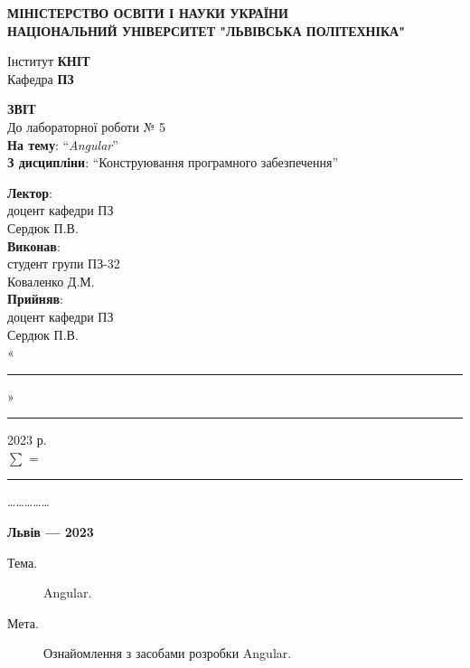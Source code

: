 \documentclass[14pt]{extreport}
\newcommand\subject{Конструювання програмного забезпечення}
\newcommand\lecturer{доцент кафедри ПЗ\\Сердюк П.В.}
\newcommand\teacher{доцент кафедри ПЗ\\Сердюк П.В.}
\newcommand\mygroup{ПЗ-32}
\newcommand\lab{5}
\newcommand\theme{Angular}
\newcommand\purpose{Ознайомлення з засобами розробки Angular}
\begin{document}
\begin{normalsize}
	\begin{titlepage}
		\thispagestyle{empty}
		\begin{center}
			\textbf{МІНІСТЕРСТВО ОСВІТИ І НАУКИ УКРАЇНИ\\
				НАЦІОНАЛЬНИЙ УНІВЕРСИТЕТ "ЛЬВІВСЬКА ПОЛІТЕХНІКА"}
		\end{center}
		\begin{flushright}
			Інститут \textbf{КНІТ}\\
			Кафедра \textbf{ПЗ}
		\end{flushright}
		\vspace{200pt}
		\begin{center}
			\textbf{ЗВІТ}\\
			\vspace{10pt}
			До лабораторної роботи № \lab\\
			\textbf{На тему}: “\textit{\theme}”\\
			\textbf{З дисципліни}: “\subject”
		\end{center}
		\vspace{40pt}
		\begin{flushright}
			
			\textbf{Лектор}:\\
			\lecturer\\
			\vspace{10pt}
			\textbf{Виконав}:\\
			
			студент групи \mygroup\\
			Коваленко Д.М.\\
			\vspace{10pt}
			\textbf{Прийняв}:\\
			
			\teacher\\
			
			\vspace{28pt}
			«\rule{1cm}{0.15mm}» \rule{1.5cm}{0.15mm} 2023 р.\\
			$\sum$ = \rule{1cm}{0.15mm}……………\\
			
		\end{flushright}
		\vspace{\fill}
		\begin{center}
			\textbf{Львів — 2023}
		\end{center}
	\end{titlepage}
		
	\begin{description}
		\item[Тема.] \theme.
		\item[Мета.] \purpose.
	\end{description}


\end{normalsize}
\end{document}
